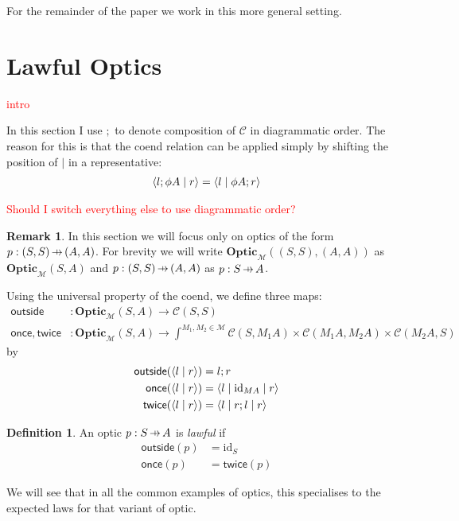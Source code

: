 \documentclass[11pt,a4paper]{article}
\theoremstyle{plain}
\theoremstyle{definition}
\newtheorem{definition}[theorem]{Definition}
\newtheorem{remark}[theorem]{Remark}
\newcommand{\C}{\mathscr{C}}
\newcommand{\M}{\mathscr{M}}
\newcommand{\Optic}{\mathbf{Optic}}
\newcommand{\id}{\mathrm{id}}
\newcommand{\rep}[2]{{\ensuremath \left\langle #1 \mid #2 \right\rangle}}
\newcommand{\repthree}[3]{{\ensuremath \langle #1 \mid #2 \mid #3 \rangle}}
\newcommand{\outside}{\mathsf{outside}}
\newcommand{\once}{\mathsf{once}}
\newcommand{\twice}{\mathsf{twice}}
\newcommand{\hto}{\ensuremath{\,\mathaccent\shortmid\rightarrow\,}}
\newcommand{\todo}[1]{\textcolor{red}{\small #1}}
\begin{document}
For the remainder of the paper we work in this more general setting.

\section{Lawful Optics}
\todo{intro}

In this section I use $;$ to denote composition of $\C$ in diagrammatic order. The reason for this is that the coend relation can be applied simply by shifting the position of $\mid$ in a representative:
\begin{align*}
\rep{l;\phi A}{r} = \rep{l}{\phi A;r}
\end{align*}

\todo{Should I switch everything else to use diagrammatic order?}

\begin{remark}
  In this section we will focus only on optics of the form $p : (S,S) \hto (A, A)$. For brevity we will write $\Optic_\M((S, S), (A, A))$ as $\Optic_\M(S, A)$ and $p : (S, S) \hto (A, A)$ as $p : S \hto A$.
\end{remark}

Using the universal property of the coend, we define three maps:
\begin{align*}
  \outside &: \Optic_\M(S, A) \to \C(S, S) \\
  \once, \twice &: \Optic_\M(S, A) \to \int^{M_1, M_2 \in \M} \C(S, M_1 A) \times \C(M_1 A, M_2 A) \times \C(M_2 A, S)
\end{align*}
by
\begin{align*}
  \outside(\rep{l}{r}) &= l;r \\
  \once(\rep{l}{r}) &= \repthree{l}{\id_{MA}}{r} \\
  \twice(\rep{l}{r}) &= \repthree{l}{r;l}{r}
\end{align*}

\begin{definition}
  An optic $p : S \hto A$ is \emph{lawful} if
  \begin{align*}
    \outside(p) &= \id_S \\
    \once(p) &= \twice(p)
  \end{align*}
\end{definition}

We will see that in all the common examples of optics, this specialises to the expected laws for that variant of optic.
\end{document}
